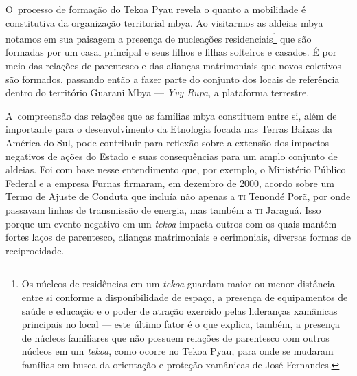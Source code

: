 O~processo de formação do Tekoa Pyau revela o quanto a mobilidade é
constitutiva da organização territorial mbya. Ao visitarmos as aldeias
mbya notamos em sua paisagem a presença de nucleações
residenciais\footnote{Os núcleos de residências em um \emph{tekoa} guardam
maior ou menor distância entre si conforme a disponibilidade de espaço,
a presença de equipamentos de saúde e educação e o poder de atração
exercido pelas lideranças xamânicas principais no local --- este último
fator é o que explica, também, a presença de núcleos familiares que não
possuem relações de parentesco com outros núcleos em um \emph{tekoa}, como
ocorre no Tekoa Pyau, para onde se mudaram famílias em busca da
orientação e proteção xamânicas de José Fernandes.} que são formadas
por um casal principal e seus filhos e filhas solteiros e casados. É
por meio das relações de parentesco e das alianças matrimoniais que
novos coletivos são formados, passando então a fazer parte do conjunto
dos locais de referência dentro do território Guarani Mbya --- \emph{Yvy Rupa},
a plataforma terrestre.

A~compreensão das relações que as famílias mbya constituem entre si,
além de importante para o desenvolvimento da Etnologia focada nas
Terras Baixas da América do Sul, pode contribuir para reflexão sobre a
extensão dos impactos negativos de ações do Estado e suas consequências
para um amplo conjunto de aldeias. Foi com base nesse entendimento que,
por exemplo, o Ministério Público Federal e a empresa Furnas firmaram,
em dezembro de 2000, acordo sobre um Termo de Ajuste de Conduta que
incluía não apenas a \textsc{ti} Tenondé Porã, por onde passavam linhas de
transmissão de energia, mas também a \textsc{ti} Jaraguá. Isso porque um evento
negativo em um \emph{tekoa} impacta outros com os quais mantém fortes laços de
parentesco, alianças matrimoniais e cerimoniais, diversas formas de
reciprocidade.

